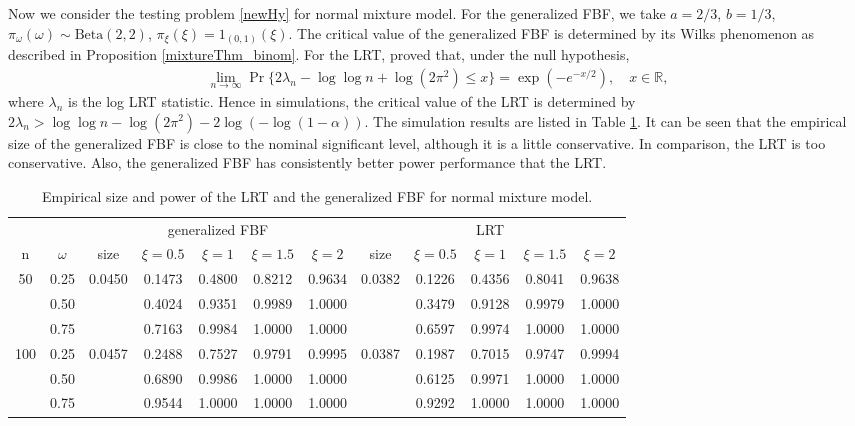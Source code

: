 \documentclass[11pt]{article}
\theoremstyle{plain}
\theoremstyle{definition}
\theoremstyle{remark}
\begin{document}
Now we consider the testing problem \eqref{newHy} for normal mixture model.
For the generalized FBF, we take $a = 2/3$, $b = 1/3$,  $\pi_\omega(\omega)\sim \text{Beta}(2, 2)$, $\pi_\xi(\xi) = 1_{(0,1)}(\xi)$.
The critical value of the generalized FBF is determined by its Wilks phenomenon as described in Proposition \ref{mixtureThm_binom}.
For the LRT, \cite{LIU200461} proved that, under the null hypothesis,
\begin{align*}
    \lim_{n\to \infty}  \Pr \{ 2\lambda_n - \log \log n + \log(2\pi^2) \leq x \} =  \exp(-e^{-x/2}), \quad x \in \mathbb R,
\end{align*}
where $\lambda_n$ is the log LRT statistic.
Hence in simulations, the critical value of the LRT is determined by $2\lambda_n > \log \log n - \log (2\pi^2) - 2\log(-\log(1-\alpha))$.
The simulation results are listed in Table \ref{normal_table1}.
It can be seen that the empirical size of the generalized FBF is close to the nominal significant level, although it is a little conservative.
In comparison, the LRT is too conservative.
Also, the generalized FBF has consistently better power performance that the LRT.
\begin{table}[ht]
    \caption{Empirical size and power of the LRT and the generalized FBF for normal mixture model.}
    \label{normal_table1}
    \small
    \centering
    \begin{tabular}{cccccccccccc}
        \toprule
         & & \multicolumn{5}{c}{generalized FBF} &\multicolumn{5}{c}{LRT}\\
        \cmidrule(r){3-7}\cmidrule(r){8-12}
        n & $\omega$ 
        & size & $\xi= 0.5$& $\xi= 1$ & $\xi= 1.5$ & $\xi= 2$
        & size & $\xi= 0.5$& $\xi= 1$ & $\xi= 1.5$ & $\xi= 2$
        \\ 
        \midrule
        50 &0.25& 0.0450& 0.1473& 0.4800& 0.8212 &0.9634& 0.0382  & 0.1226& 0.4356 & 0.8041 & 0.9638 \\
        &0.50   &       & 0.4024& 0.9351& 0.9989 &1.0000&         &0.3479 & 0.9128 & 0.9979 & 1.0000 \\
        &0.75 &         &0.7163 & 0.9984& 1.0000 &1.0000&         &0.6597 & 0.9974 & 1.0000 & 1.0000 \\
        \midrule
        100 &0.25 &0.0457& 0.2488& 0.7527& 0.9791 &0.9995& 0.0387 & 0.1987& 0.7015 & 0.9747 & 0.9994\\
        &0.50   &       & 0.6890& 0.9986& 1.0000 &1.0000&       & 0.6125 & 0.9971 & 1.0000 & 1.0000\\
        &0.75   &       & 0.9544& 1.0000& 1.0000 &1.0000&       & 0.9292& 1.0000& 1.0000 & 1.0000\\
        \bottomrule

    \end{tabular}

\end{table}
\end{document}
